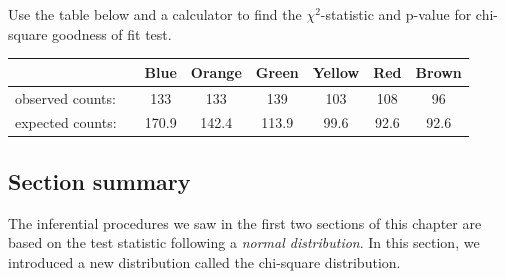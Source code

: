 \begin{exercisewrap}
\begin{nexercise}
Use the table below and a calculator to find the $\chi^2$-statistic and p-value for chi-square goodness of fit test.\footnotemark
\begin{center}
\begin{tabular}{ll ccc ccc}
\hline
	 & \hspace{1mm} & Blue & Orange & Green & Yellow & Red & Brown\\
\hline
observed counts:&		& 133 & 133 & 139 & 103 & 108 & 96  \\
expected counts:&		& 170.9 &  142.4 & 113.9 & 99.6 & 92.6 & 92.6\\
\hline
\end{tabular}
\end{center}

\end{nexercise}
\end{exercisewrap}


\D{\newpage}

\subsection*{Section summary} 
\noindent The inferential procedures we saw in the first two sections of this chapter are based on the test statistic following a \textit{normal distribution}.  In this section, we introduced a new distribution called the chi-square distribution.  

